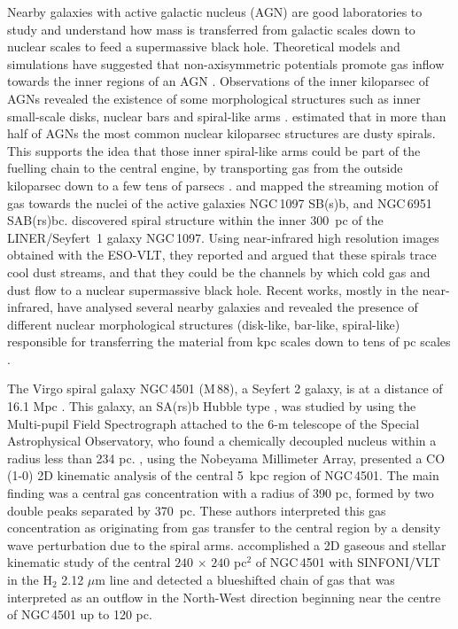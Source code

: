 \documentclass[fleqn,usenatbib]{mnras}
\begin{document}
Nearby galaxies with active galactic nucleus (AGN) are good laboratories to study and understand how mass is transferred from galactic scales down to nuclear scales to feed a 
supermassive black hole. Theoretical models and simulations have suggested that non-axisymmetric potentials promote gas inflow towards the inner regions of 
an AGN \citep{Shlosman1990,Emsellem2003,Knapen2005,Englmaier2004}. Observations of the inner kiloparsec of AGNs revealed the existence of some morphological 
structures such as inner small-scale disks, nuclear bars and spiral-like arms \citep{Erwin1999, Pogge2002, Laine2003}. \citet{Martini2003} estimated that in 
more than half of AGNs the most common nuclear kiloparsec structures are dusty spirals. This supports the idea that those inner spiral-like arms could be part 
of the fuelling chain to the central engine, by transporting gas from the outside kiloparsec down to a few tens of parsecs 
\citep{Knapen2000, Emsellem2001, Maciejewski2002, Marconi2003, Crenshaw2003, Fathi2005, Fathi2006, Maciejewski2004}. \citet{Fathi2005} and 
\citet{Storchi-Bergmann2007} mapped the streaming motion of gas towards the nuclei of the active galaxies NGC\,1097 SB(s)b, and NGC\,6951 SAB(rs)bc. 
\citet{Prieto2005} discovered spiral structure within the inner \mbox{300 pc} of the LINER/\mbox{Seyfert 1} galaxy NGC\,1097. Using near-infrared high resolution images obtained with 
the ESO-VLT, they reported and argued that these spirals trace cool dust streams, and that they could be the channels by which cold gas and dust flow to a nuclear 
supermassive black hole. Recent works, mostly in the near-infrared,  have analysed several nearby galaxies and revealed 
the presence of different nuclear morphological structures (disk-like, bar-like, spiral-like) responsible for transferring the material from kpc scales down to tens of pc scales 
\citep{Riffel2008, Storchi-Bergmann2010, Riffel2011, Riffel2013, Schnorr-Muller2014}.

The Virgo spiral galaxy NGC\,4501 (M\,88), a Seyfert 2 galaxy, is at a distance of 16.1 Mpc \citep{Ferrarese1996}. This galaxy, an SA(rs)b Hubble type \citep{deVaucouleurs1991},  
was studied by \citet{Silchenko1999} using the Multi-pupil Field Spectrograph attached to the 6-m telescope of the Special Astrophysical Observatory, who found a 
chemically decoupled nucleus within a radius less than 234 pc. \citet{Onodera2004}, using the Nobeyama Millimeter Array, presented a CO (1-0) 2D kinematic analysis of the central 
\mbox{5 kpc} region of NGC\,4501. The main finding was a central gas concentration with a radius of 390 pc, formed by two double peaks separated by \mbox{370 pc}. These authors 
interpreted this gas concentration as originating from gas transfer to the central region by a density wave perturbation due to the spiral arms. 
\citet{Mazzalay2014} accomplished a 2D gaseous and stellar kinematic study of the central $240\,\times\,240$ pc$^2$ of NGC\,4501 with SINFONI/VLT in the H$_2$ 2.12 $\mu$m 
line and detected a blueshifted chain of gas that was interpreted as an outflow in the North-West direction beginning near the centre of NGC\,4501 up to 120 pc. 
\end{document}
